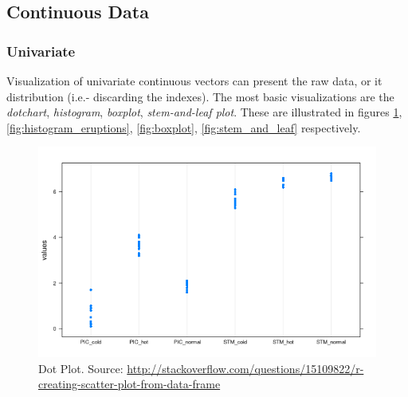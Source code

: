 \documentclass[12pt,a4paper]{report}
\begin{document}
\afterpage{\clearpage}


\subsection{Continuous Data}




\subsubsection{Univariate}
Visualization of univariate continuous vectors can present the raw data, or it distribution (i.e.- discarding the indexes).
The most basic visualizations are the \emph{dotchart}, \emph{histogram}, \emph{boxplot}, \emph{stem-and-leaf plot}. 
These are illustrated in figures \ref{fig:dot_plot}, \ref{fig:histogram_eruptions}, \ref{fig:boxplot}, \ref{fig:stem_and_leaf} respectively. 


 
\begin{figure}[h]
\centering
\includegraphics[height=0.3\textheight]{art/lmCm0}
\caption[Dot Plot]{Dot Plot. Source: \url{http://stackoverflow.com/questions/15109822/r-creating-scatter-plot-from-data-frame}}
\label{fig:dot_plot}
\end{figure}
\end{document}
